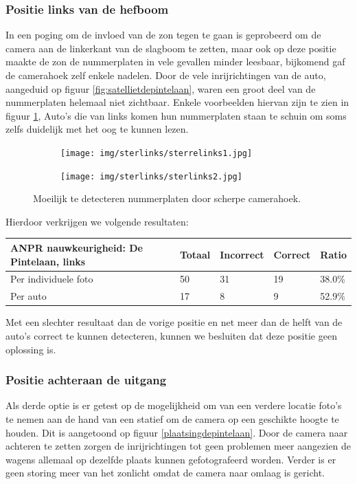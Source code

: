 \subsubsection{Positie links van de hefboom}
In een poging om de invloed van de zon tegen te gaan is geprobeerd om de camera aan de linkerkant van de slagboom te zetten, maar ook op deze positie maakte de zon de nummerplaten in vele gevallen minder leesbaar, bijkomend gaf de camerahoek zelf enkele nadelen. Door de vele inrijrichtingen van de auto, aangeduid op figuur \ref{fig:satellietdepintelaan}, waren een groot deel van de nummerplaten helemaal niet zichtbaar. Enkele voorbeelden hiervan zijn te zien in figuur \ref{fig:sterre-links}, Auto's die van links komen hun nummerplaten staan te schuin om soms zelfs duidelijk met het oog te kunnen lezen.

\begin{figure}[h!]
	\centering
	\begin{subfigure}[b]{0.4\linewidth}
		\texttt{[image: img/sterlinks/sterrelinks1.jpg]}
	\end{subfigure}
	\begin{subfigure}[b]{0.4\linewidth}
		\texttt{[image: img/sterlinks/sterlinks2.jpg]}
	\end{subfigure}
	\caption{Moeilijk te detecteren nummerplaten door scherpe camerahoek.}
	\label{fig:sterre-links}
\end{figure}

Hierdoor verkrijgen we volgende resultaten:
\begin{table}[h!]
	\centering
	\begin{tabular}{l|l|l|l|l}
		\textbf{ANPR nauwkeurigheid: De Pintelaan, links} & Totaal & Incorrect & Correct & Ratio	\\ \hline
		Per individuele foto 	& 50 & 31	& 19	& 38.0\%\\
		Per auto				& 17 & 8	& 9 	& 52.9\%\\
	\end{tabular}
\end{table}

Met een slechter resultaat dan de vorige positie en net meer dan de helft van de auto's correct te kunnen detecteren, kunnen we besluiten dat deze positie geen oplossing is.

\subsubsection{Positie achteraan de uitgang}
Als derde optie is er getest op de mogelijkheid om van een verdere locatie foto's te nemen aan de hand van een statief om de camera op een geschikte hoogte te houden. Dit is aangetoond op figuur \ref{plaatsingdepintelaan}. Door de camera naar achteren te zetten zorgen de inrijrichtingen tot geen problemen meer aangezien de wagens allemaal op dezelfde plaats kunnen gefotografeerd worden. Verder is er geen storing meer van het zonlicht omdat de camera naar omlaag is gericht.

